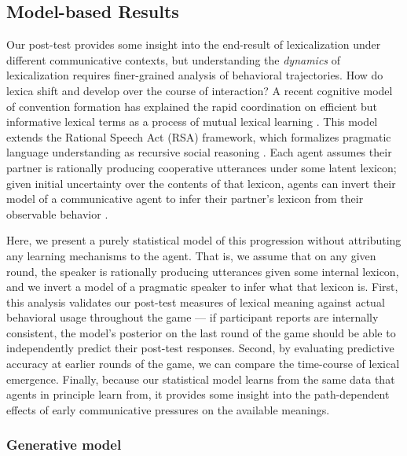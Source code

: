\documentclass[10pt,letterpaper]{article}
\begin{document}
\subsection{Model-based Results}

Our post-test provides some insight into the end-result of lexicalization under different communicative contexts, but understanding the \emph{dynamics} of lexicalization requires finer-grained analysis of behavioral trajectories. How do lexica shift and develop over the course of interaction? A recent cognitive model of convention formation has explained the rapid coordination on efficient but informative lexical terms as a process of mutual lexical learning \cite{HawkinsFrankGoodman17_ConventionFormation}. This model extends the Rational Speech Act (RSA) framework, which formalizes pragmatic language understanding as recursive social reasoning \cite{FrankGoodman12_PragmaticReasoningLanguageGames,GoodmanFrank16_RSATiCS}. Each agent assumes their partner is rationally producing cooperative utterances under some latent lexicon; given initial uncertainty over the contents of that lexicon, agents can invert their model of a communicative agent to infer their partner's lexicon from their observable behavior \cite{BergenLevyGoodman16_LexicalUncertainty}. 

Here, we present a purely statistical model of this progression without attributing any learning mechanisms to the agent. That is, we assume that on any given round, the speaker is rationally producing utterances given some internal lexicon, and we invert a model of a pragmatic speaker to infer what that lexicon is. First, this analysis validates our post-test measures of lexical meaning against actual behavioral usage throughout the game --- if participant reports are internally consistent, the model's posterior on the last round of the game should be able to independently predict their post-test responses. Second, by evaluating predictive accuracy at earlier rounds of the game, we can compare the time-course of lexical emergence. Finally, because our statistical model learns from the same data that agents in principle learn from, it provides some insight into the path-dependent effects of early communicative pressures on the available meanings. %

\subsubsection{Generative model}
\end{document}
